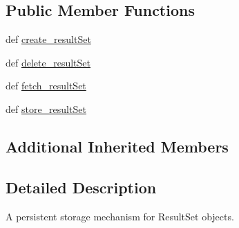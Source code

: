 \subsection*{Public Member Functions}
\begin{DoxyCompactItemize}
\item 
def \hyperlink{classcheshire3_1_1base_objects_1_1_result_set_store_ac50f5f4c6c3227b604bc8c5679f27517}{create\-\_\-result\-Set}
\item 
def \hyperlink{classcheshire3_1_1base_objects_1_1_result_set_store_a5a181b9c87f6190c7f3142626bc0fb8b}{delete\-\_\-result\-Set}
\item 
def \hyperlink{classcheshire3_1_1base_objects_1_1_result_set_store_a518cec385486d3e967b79f1f5ca804fe}{fetch\-\_\-result\-Set}
\item 
def \hyperlink{classcheshire3_1_1base_objects_1_1_result_set_store_a49c93bc0a852e0e387a7ff86fbeab2fe}{store\-\_\-result\-Set}
\end{DoxyCompactItemize}
\subsection*{Additional Inherited Members}


\subsection{Detailed Description}
\begin{DoxyVerb}A persistent storage mechanism for ResultSet objects.\end{DoxyVerb}
 

